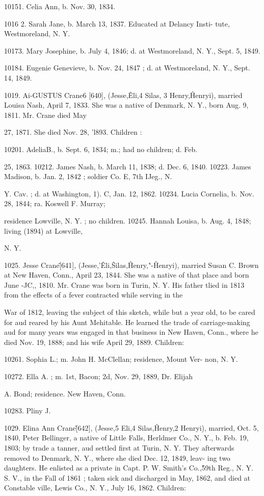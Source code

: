 \documentclass{book}
\begin{document}
10151. Celia Ann, b. Nov. 30, 1834. 

1016  2. Sarah Jane, b. March 13, 1837. Educated at Delancy Insti- 
tute, Westmoreland, N. Y. 

10173. Mary Josephine, b. July 4, 1846; d. at Westmoreland, N. 
Y., Sept. 5, 1849. 

10184. Eugenie Genevieve, b. Nov. 24, 1847 ; d. at Westmoreland, 
N. Y., Sept. 14, 1849. 

1019. Ai-GUSTUS Crane6 [640], (Jesse,\^ Eli,4 Silas, 3 Henry,\^ 
Henryi), married Louisa Nash, April 7, 1833. She was a native 
of Denmark, N. Y., born Aug. 9, 1811. Mr. Crane died May 

27, 1871. She died Nov. 28, 'l893. Children : 

10201. AdeliaB., b. Sept. 6, 1834; m.; had no children; d. Feb. 

25, 1863. 
10212. James Nash, b. March 11, 1838; d. Dec. 6, 1840. 
10223. James Madison, b. Jan. 2, 1842 ; soldier Co. E, 7th IJeg., N. 

Y. Cav. ; d. at Washington, 1). C, Jan. 12, 1862. 
10234. Lucia Cornelia, b. Nov. 28, 1844; ra. Koswell F. Murray; 

residence Lowville, N. Y. ; no children. 
10245. Hannah Louisa, b. Aug. 4, 1848; living (1894) at Lowville, 

N. Y. 

1025. Jesse Crane\^ [641], (Jesse,'\^ Eli,\^ Silas,\^ Henry,"-\^ 
Henryi), married Susan C. Brown at New Haven, Conn., April 
23, 1844. She was a native of that place and born June -JC,, 
1810. Mr. Crane was born in Turin, N. Y. His father tlied in 
1813 from the effects of a fever contracted while serving in the 




War of 1812, leaving the subject of this sketch, while but a year 
old, to be cared for aud reared by his Aunt Mehitable. He 
learned the trade of carriage-making aud for many years was 
engaged in that business in New Haven, Conn., where he died 
Nov. 19, 1888; and his wife April 29, 1889. Children: 

10261. Sophia L.; m. John H. McClellan; residence, Mount Ver- 
non, N. Y. 

10272. Ella A. ; m. 1st, Bacon; 2d, Nov. 29, 1889, Dr. Elijah 

A. Bond; residence. New Haven, Conn. 

10283. Pliny J. 

1029. Elina Ann Crane\^ [642], (Jesse,5 Eli,4 Silas,\^ Henry,2 
Henryi), married, Oct. 5, 1840, Peter Bellinger, a native of 
Little Falls, Herldmer Co., N. Y., b. Feb. 19, 1803; by trade a 
tanner, aud settled first at Turin, N. Y. They afterwards 
removed to Denmark, N. Y., where she died Dec. 12, 1849, leav- 
ing two daughters. He enlisted as a private in Capt. P. W. 
Smith's Co.,\^59th Reg., N. Y. S. V., in the Fall of 1861 ; taken 
sick and discharged in May, 1862, and died at Constable ville, 
Lewis Co., N. Y., July 16, 1862. Children: 
\end{document}
